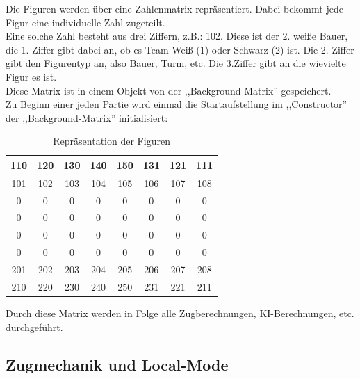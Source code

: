 \documentclass[12pt,a4paper]{article}
\begin{document}
{Die Figuren werden über eine Zahlenmatrix repräsentiert. Dabei bekommt jede Figur eine individuelle Zahl zugeteilt. \\
Eine solche Zahl besteht aus drei Ziffern, z.B.: 102. Diese ist der 2. weiße Bauer, die 1. Ziffer gibt dabei an, ob es Team Weiß (1) oder Schwarz (2) ist. Die 2. Ziffer gibt den Figurentyp an, also Bauer, Turm, etc. Die 3.Ziffer gibt an die wievielte Figur es ist. \\
Diese Matrix ist in einem Objekt von der ,,Background-Matrix'' gespeichert. \\
Zu Beginn einer jeden Partie wird einmal die Startaufstellung im ,,Constructor'' der ,,Background-Matrix'' initialisiert:

	\begin{table}[H]
		\centering
		\begin{tabular}{| c | c | c | c | c | c | c | c |}
			\hline
			110 & 120 	& 	130 & 140 	& 150 	& 131 	& 121 	& 	111 \\ \hline
			101 & 102 	& 	103 & 	104 & 	105 & 	106 & 	107 & 	108 \\ \hline
			0	&	0	& 	0	&	0	&	0	&	0	&	0	&	0	\\ \hline
			0	&	0	& 	0	&	0	&	0	&	0	&	0	&	0 	\\ \hline
			0	&	0	& 	0	&	0	&	0	&	0	&	0	&	0 	\\ \hline
			0	&	0	& 	0	&	0	&	0	&	0	&	0	&	0 	\\ \hline
			201 &	202 &	203	&	204	&	205	&	206	&	207	&	208	\\ \hline
			210 & 	220	&	230	&	240	&	250	&	231	&	221	&	211 \\ 
			\hline	
		\end{tabular}
		\caption{Repräsentation der Figuren}
		\label{TABLE:REPRESENTATION-MEEPLES}
	\end{table}

Durch diese Matrix werden in Folge alle Zugberechnungen, KI-Berechnungen, etc. durchgeführt. \\


\subsection{Zugmechanik und Local-Mode}
\label{SUBSEC:LOCAL_MODE}

}
\end{document}
